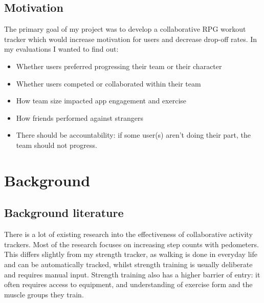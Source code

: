 \documentclass{l4proj}
\begin{document}
\section{Motivation}
The primary goal of my project was to develop a collaborative RPG workout tracker which would increase motivation for users and decrease drop-off rates. In my evaluations I wanted to find out:
\begin{itemize}    
    \item
      Whether users preferred progressing their team or their character
    \item
      Whether users competed or collaborated within their team
    \item
      How team size impacted app engagement and exercise
    \item 
      How friends performed against strangers
    \item 
      There should be accountability: if some user(s) aren't doing their part, the team should not progress.
\end{itemize}




\chapter{Background}

\section{Background literature}
There is a lot of existing research into the effectiveness of collaborative activity trackers. Most of the research focuses on increasing step counts with pedometers. This differs slightly from my strength tracker, as walking is done in everyday life and can be automatically tracked, whilst strength training is usually deliberate and requires manual input. Strength training also has a higher barrier of entry: it often requires access to equipment, and understanding of exercise form and the muscle groups they train.
\end{document}

